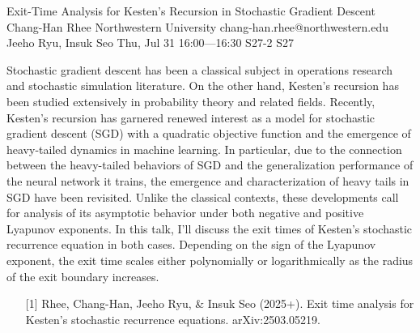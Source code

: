 \begin{talk}
  {Exit-Time Analysis for Kesten's Recursion in Stochastic Gradient Descent}%
  {Chang-Han Rhee}%
  {Northwestern University}%
  {chang-han.rhee@northwestern.edu}%
  {Jeeho Ryu, Insuk Seo}%
  {}%
  {Thu, Jul 31 16:00---16:30}%
  {S27-2}%
  {S27}%
  
    


Stochastic gradient descent has been a classical subject in operations research and stochastic simulation literature.
On the other hand, Kesten's recursion has been studied extensively in probability theory and related fields. 
Recently, Kesten's recursion has garnered renewed interest as a model for stochastic
gradient descent (SGD) with a quadratic objective function and the emergence of heavy-tailed dynamics in machine learning. 
In particular, due to the connection between the heavy-tailed behaviors of SGD and the generalization performance of the neural network it trains, the emergence and characterization of heavy tails in SGD have been revisited. 
Unlike the classical contexts, these developments call for analysis of its asymptotic behavior under both negative and positive Lyapunov exponents. In this talk, I'll discuss the exit times of Kesten's stochastic recurrence equation in both cases. Depending on the sign of the Lyapunov exponent, the exit time scales either polynomially or logarithmically as the radius of the exit boundary increases.

\medskip

\begin{enumerate}
 \item[{[1]}] 
    Rhee, Chang-Han, Jeeho Ryu, \& Insuk Seo (2025+). Exit time analysis for Kesten's stochastic recurrence equations. arXiv:2503.05219.
    

\end{enumerate}

\end{talk}

